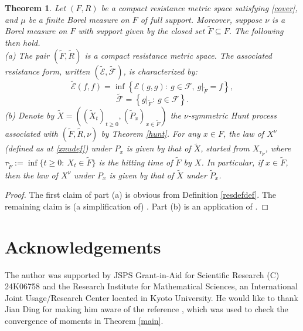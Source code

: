 \documentclass[a4paper, 11pt]{article}
\newtheorem{theorem}{Theorem}[section]
\begin{document}
\begin{theorem}\label{timechangethm}
Let $(F,R)$ be a compact resistance metric space satisfying \eqref{cover}, and $\mu$ be a finite Borel measure on $F$ of full support. Moreover, suppose $\nu$ is a Borel measure on $F$ with support given by the closed set $\tilde{F}\subseteq F$. The following then hold.\\
(a) The pair $(\tilde{F},\tilde{R})$ is a compact resistance metric space. The associated resistance form, written  $(\tilde{\mathcal{E}},\tilde{\mathcal{F}})$, is characterized by:
\[\tilde{\mathcal{E}}(f,f)=\inf\left\{\mathcal{E}(g,g):\:g\in\mathcal{F},\:g|_{\tilde{F}}=f\right\},\]
\[\tilde{\mathcal{F}}=\left\{g|_{\tilde{F}}:\:g\in\mathcal{F}\right\}.\]
(b) Denote by $\tilde{X}=((\tilde{X}_t)_{t\geq 0},(\tilde{P}_x)_{x\in \tilde{F}})$ the $\nu$-symmetric Hunt process associated with $(\tilde{F},\tilde{R},\nu)$ by Theorem \ref{hunt}. For any $x\in F$, the law of $X^{\nu}$ (defined as at \eqref{xnudef}) under $P_x$ is given by that of $\tilde{X}$, started from $X_{\tau_{\tilde{F}}}$, where $\tau_{\tilde{F}}:=\inf\{t\geq 0:\:X_t\in\tilde{F}\}$ is the hitting time of $\tilde{F}$ by $X$. In particular, if $x\in \tilde{F}$, then the law of $X^{\nu}$ under $P_x$ is given by that of $\tilde{X}$ under $\tilde{P}_x$.
\end{theorem}
\begin{proof}
The first claim of part (a) is obvious from Definition \ref{resdefdef}. The remaining claim is (a simplification of) \cite[Theorem 8.4]{Kigres}. Part (b) is an application of \cite[Theorem 6.2.1]{FOT}.
\end{proof}

\section*{Acknowledgements}

The author was supported by JSPS Grant-in-Aid for Scientific Research (C) 24K06758 and the Research Institute for Mathematical Sciences, an International Joint Usage/Research Center located in Kyoto University. He would like to thank Jian Ding for making him aware of the reference \cite{Zhai}, which was used to check the convergence of moments in Theorem \ref{main}.



\end{document}
